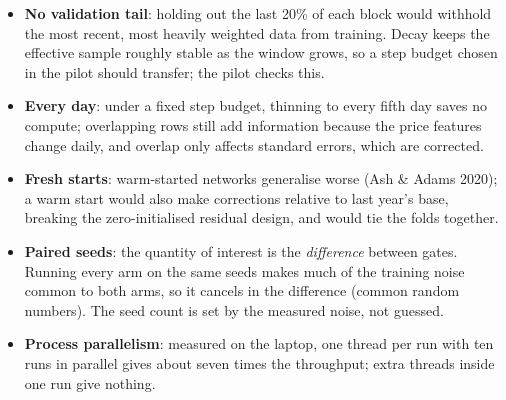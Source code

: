 \begin{whybox}
\begin{itemize}
\item \textbf{No validation tail}: holding out the last 20\% of each block would withhold the most recent, most
  heavily weighted data from training. Decay keeps the effective sample roughly stable as the window grows,
  so a step budget chosen in the pilot should transfer; the pilot checks this.
\item \textbf{Every day}: under a fixed step budget, thinning to every fifth day saves no compute; overlapping
  rows still add information because the price features change daily, and overlap only affects standard
  errors, which are corrected.
\item \textbf{Fresh starts}: warm-started networks generalise worse (Ash \& Adams 2020); a warm start would also
  make corrections relative to last year's base, breaking the zero-initialised residual design, and would
  tie the folds together.
\item \textbf{Paired seeds}: the quantity of interest is the \emph{difference} between gates. Running every arm on
  the same seeds makes much of the training noise common to both arms, so it cancels in the difference
  (common random numbers). The seed count is set by the measured noise, not guessed.
\item \textbf{Process parallelism}: measured on the laptop, one thread per run with ten runs in parallel gives
  about seven times the throughput; extra threads inside one run give nothing.
\end{itemize}
\end{whybox}
